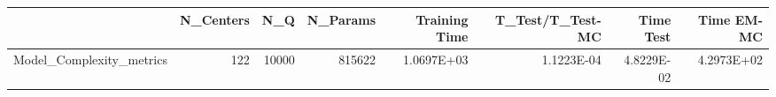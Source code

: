 \begin{tabular}{lrrrrrrr}
\toprule
{} &  N\_Centers &    N\_Q &  N\_Params &  Training Time &  T\_Test/T\_Test-MC &  Time Test &  Time EM-MC \\
\midrule
Model\_Complexity\_metrics &        122 &  10000 &    815622 &     1.0697E+03 &        1.1223E-04 & 4.8229E-02 &  4.2973E+02 \\
\bottomrule
\end{tabular}
